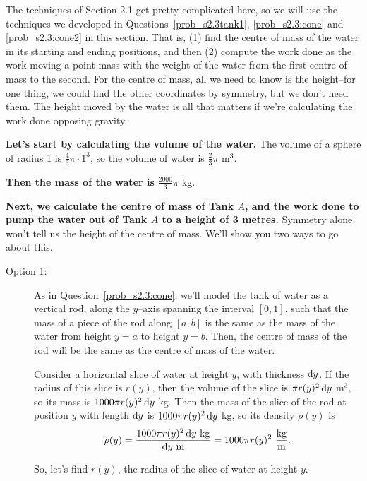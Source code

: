 \begin{solution}
The techniques of Section 2.1 get pretty complicated here, so we will use the techniques we developed in Questions~\ref{prob_s2.3tank1}, \ref{prob_s2.3:cone} and \ref{prob_s2.3:cone2} in this section. That is, (1) find the centre of mass of the water in its starting and ending positions, and then (2) compute the work done as the work moving a point mass with the weight of the water from the first centre of mass to the second. For the centre of mass, all we need to know is the height--for one thing, we could find the other coordinates by symmetry, but we don't need them. The height moved by the water is all that matters if we're calculating the work done opposing gravity.

\textbf{Let's start by calculating the volume of the water.} The volume of a sphere of radius 1 is $\frac{4}{3}\pi\cdot 1^3$, so the volume of water is $\frac{2}{3}\pi$ m$^3$.

\textbf{Then the mass of the water is} $\frac{2000}{3}\pi$ kg.

\textbf{Next, we calculate the centre of mass of Tank $A$, and the work done to pump the water out of Tank $A$ to a height of 3 metres.} Symmetry alone won't tell us  the height of the centre of mass. We'll show you two ways to go about this.

\begin{description}
\item[Option 1:] As in Question~\ref{prob_s2.3:cone}, we'll model the tank of water as a vertical rod, along the $y$--axis spanning the interval $[0,1]$, such that the mass of a piece of the rod along $[a,b]$ is the same as the mass of the water from height $y=a$ to height $y=b$. Then, the centre of mass of the rod will be the same as the centre of mass of the water.

Consider a horizontal slice of water at height $y$, with thickness $\mathrm{d}y$. If the radius of this slice is $r(y)$, then the volume of the slice is $\pi r(y)^2\,\mathrm{d}y$ m$^3$, so its mass is $1000\pi r(y)^2\,\mathrm{d}y$ kg. Then the mass of the slice of the rod at position $y$ with length $\mathrm{d}y$ is $1000\pi r(y)^2\,\mathrm{d}y$ kg, so its density $\rho(y)$ is
\[\rho(y) = \frac{1000\pi r(y)^2\,\mathrm{d}y\text{ kg}}{\mathrm{d}y\text{ m}} = 1000\pi r(y)^2 ~\frac{\text{kg}}{\text{m}}.\]

So, let's find $r(y)$, the radius of the slice of water at height $y$.
\begin{center}
\end{center}


\end{description}
\end{solution}
